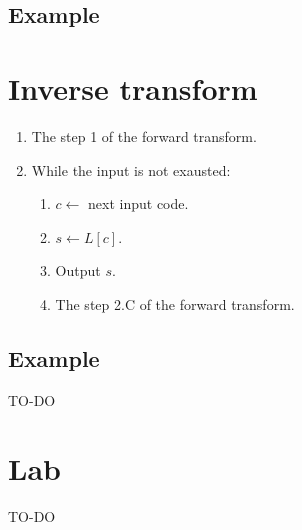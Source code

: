 \subsection{Example}

\section{Inverse transform}
\begin{enumerate}
\def\labelenumi{\arabic{enumi}.}
\tightlist
\item
  The step 1 of the forward transform.
\item
  While the input is not exausted:
  \begin{enumerate}
  \def\labelenumii{\arabic{enumii}.}
  \tightlist
  \item
    \(c\leftarrow\) next input code.
  \item
    \(s\leftarrow L[c]\).
  \item
    Output \(s\).
  \item
    The step 2.C of the forward transform.
  \end{enumerate}
\end{enumerate}

\subsection{Example}
TO-DO

\section{Lab}
TO-DO


